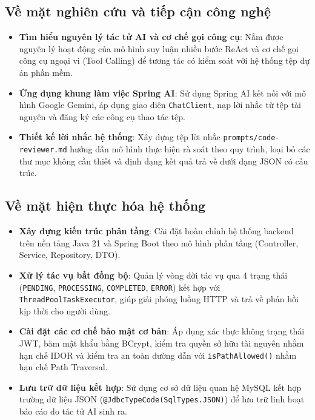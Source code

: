 \documentclass[12pt,a4paper]{report}
\begin{document}
\subsection{Về mặt nghiên cứu và tiếp cận công nghệ}
\begin{itemize}
    \item \textbf{Tìm hiểu nguyên lý tác tử AI và cơ chế gọi công cụ}: Nắm được nguyên lý hoạt động của mô hình suy luận nhiều bước ReAct và cơ chế gọi công cụ ngoại vi (Tool Calling) để tương tác có kiểm soát với hệ thống tệp dự án phần mềm.
    \item \textbf{Ứng dụng khung làm việc Spring AI}: Sử dụng Spring AI kết nối với mô hình Google Gemini, áp dụng giao diện \texttt{ChatClient}, nạp lời nhắc từ tệp tài nguyên và đăng ký các công cụ thao tác tệp.
    \item \textbf{Thiết kế lời nhắc hệ thống}: Xây dựng tệp lời nhắc \texttt{prompts/code-reviewer.md} hướng dẫn mô hình thực hiện rà soát theo quy trình, loại bỏ các thư mục không cần thiết và định dạng kết quả trả về dưới dạng JSON có cấu trúc.
\end{itemize}

\subsection{Về mặt hiện thực hóa hệ thống}
\begin{itemize}
    \item \textbf{Xây dựng kiến trúc phân tầng}: Cài đặt hoàn chỉnh hệ thống backend trên nền tảng Java 21 và Spring Boot theo mô hình phân tầng (Controller, Service, Repository, DTO).
    \item \textbf{Xử lý tác vụ bất đồng bộ}: Quản lý vòng đời tác vụ qua 4 trạng thái (\texttt{PENDING}, \texttt{PROCESSING}, \texttt{COMPLETED}, \texttt{ERROR}) kết hợp với \texttt{ThreadPoolTaskExecutor}, giúp giải phóng luồng HTTP và trả về phản hồi kịp thời cho người dùng.
    \item \textbf{Cài đặt các cơ chế bảo mật cơ bản}: Áp dụng xác thực không trạng thái JWT, băm mật khẩu bằng BCrypt, kiểm tra quyền sở hữu tài nguyên nhằm hạn chế IDOR và kiểm tra an toàn đường dẫn với \texttt{isPathAllowed()} nhằm hạn chế Path Traversal.
    \item \textbf{Lưu trữ dữ liệu kết hợp}: Sử dụng cơ sở dữ liệu quan hệ MySQL kết hợp trường dữ liệu JSON (\texttt{@JdbcTypeCode(SqlTypes.JSON)}) để lưu trữ linh hoạt báo cáo do tác tử AI sinh ra.
\end{itemize}
\end{document}
